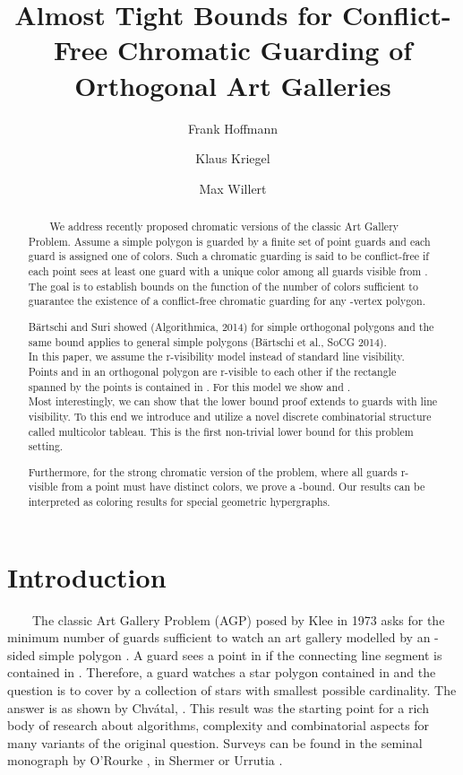 \documentclass[a4paper,USenglish,numberwithinsect]{lipics}
\title{Almost Tight Bounds for  Conflict-Free Chromatic Guarding of Orthogonal Art Galleries}
\author[1]{Frank Hoffmann}
\author[1]{Klaus Kriegel}
\author[1]{Max Willert}
\affil[1]{Freie Universit\"at Berlin, Institut f\"ur Informatik, 14195 Berlin, Germany\\
  \texttt{\{hoffmann,kriegel,willerma\}@mi.fu-berlin.de}}
\theoremstyle{plain}
\begin{document}
\maketitle

\begin{abstract}
\ \ \ \ We address recently proposed chromatic versions of the
classic Art Gallery Problem. Assume a 
simple  polygon  is guarded by a finite set of point guards and each
guard is assigned one of  colors. Such a chromatic guarding is said to be
conflict-free if each point  sees at least one guard with a
unique color among all guards visible from . The goal is to establish
bounds on the function  of the number of colors sufficient
to guarantee the existence of a conflict-free chromatic guarding for any
-vertex polygon.

 B\"artschi and Suri showed   (Algorithmica,
2014) for simple orthogonal polygons and the same bound applies to
general simple polygons (B\"artschi et al., SoCG 2014).\\
In this paper, we assume the r-visibility model
instead of standard line visibility. Points  and  in an orthogonal polygon  are r-visible to
each other if the rectangle spanned by the points is contained in .
For this model we show   and
.\\
Most interestingly, we can show that the lower bound proof extends to guards with line visibility. 
To this end we introduce and utilize a novel discrete combinatorial structure called multicolor tableau. This is the first non-trivial lower bound for this problem setting.

Furthermore, for the strong chromatic version of the problem, where all
guards r-visible from a point must have distinct colors, we prove a
-bound.
Our results can be interpreted as coloring results for special
geometric hypergraphs.

\end{abstract}

\section{Introduction}

\ \ \ \ The classic Art Gallery Problem (AGP) posed by Klee in 1973 asks for the
minimum number of guards sufficient to watch an art gallery modelled by
an -sided simple polygon . A  guard sees a point in  if the
connecting line segment is contained in . Therefore, a guard
watches a star polygon contained in  and the question is to cover 
by a collection of stars with smallest possible cardinality. The answer
is  as shown by Chv\'atal, \cite{Ch}. This result was
the starting point for a rich body of research about algorithms,
complexity and combinatorial aspects for many variants of the original
question. Surveys can be found in the seminal monograph by O'Rourke
\cite{ORourke}, in Shermer \cite{Sh} or Urrutia \cite{Ur}. 
\end{document}
